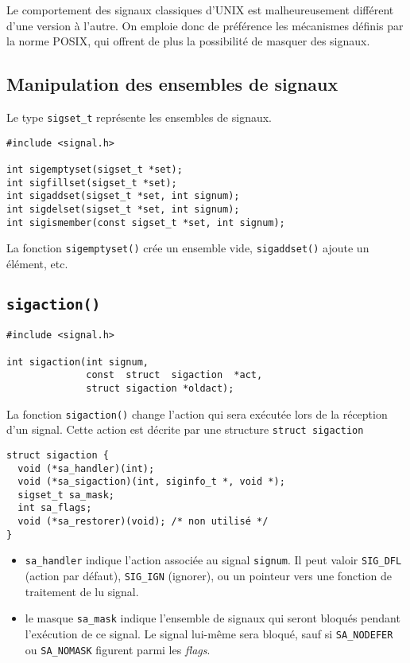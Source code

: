 
Le comportement des signaux classiques d'UNIX est
 malheureusement différent d'une version à l'autre.
On emploie donc de préférence les mécanismes définis par
la norme POSIX, qui offrent de plus la possibilité de masquer des signaux.


\subsection{Manipulation des ensembles de signaux}

Le type \texttt{sigset\_t} représente les ensembles de signaux.


\extrait
\begin{lstlisting}
#include <signal.h>

int sigemptyset(sigset_t *set);
int sigfillset(sigset_t *set);
int sigaddset(sigset_t *set, int signum);
int sigdelset(sigset_t *set, int signum);
int sigismember(const sigset_t *set, int signum);
\end{lstlisting}



La fonction \texttt{sigemptyset()} crée un ensemble vide,
\texttt{sigaddset()} ajoute un élément, etc.

\subsection{\texttt{sigaction()} }



\extrait
\begin{lstlisting}
#include <signal.h>

int sigaction(int signum,  
              const  struct  sigaction  *act,
              struct sigaction *oldact);
              \end{lstlisting}


La fonction \texttt{sigaction()} change l'action qui sera
exécutée lors de la réception d'un signal. Cette action
est décrite par une structure \texttt{struct sigaction}


\extrait
\begin{lstlisting}
struct sigaction {
  void (*sa_handler)(int);
  void (*sa_sigaction)(int, siginfo_t *, void *);
  sigset_t sa_mask;
  int sa_flags;
  void (*sa_restorer)(void); /* non utilisé */
}            
\end{lstlisting}


\begin{itemize}
\item \texttt{sa\_handler} indique l'action associée au signal
\texttt{signum}. Il peut valoir
\texttt{SIG\_DFL} (action par défaut),
\texttt{SIG\_IGN} (ignorer),
ou un pointeur vers une fonction de traitement de lu signal.

\item 
le masque \texttt{sa\_mask} indique l'ensemble de signaux qui seront bloqués
pendant l'exécution de ce signal. Le signal lui-même sera bloqué, sauf
si \texttt{SA\_NODEFER} ou \texttt{SA\_NOMASK} figurent parmi les \emph{flags}.
\end{itemize}

